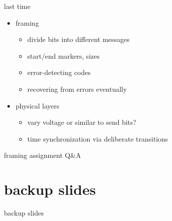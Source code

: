 \date{}
\title{}
\date{}
\usepackage{pgfplots}
\pgfplotsset{compat=1.16}

\begin{frame}
    \titlepage
\end{frame}

\begin{frame}{last time}
    \begin{itemize}
    \item framing
        \begin{itemize}
        \item divide bits into different messages
        \item start/end markers, sizes
        \item error-detecting codes
        \item recovering from errors eventually
        \end{itemize}
    \item physical layers
        \begin{itemize}
        \item vary voltage or similar to send bits?
        \item time synchronization via deliberate transitions
        \end{itemize}
    \end{itemize}
\end{frame}

\begin{frame}{}
\end{frame}

\begin{frame}{framing assignment Q\&A}
\end{frame}



\section{backup slides}
\begin{frame}{backup slides}
\end{frame}


